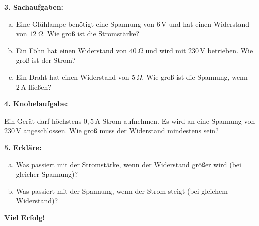 \vspace{0.5em}

\textbf{3. Sachaufgaben:}
\begin{enumerate}[a)]
    \item Eine Glühlampe benötigt eine Spannung von $6\,\mathrm{V}$ und hat einen Widerstand von $12\,\Omega$. Wie groß ist die Stromstärke?
    \item Ein Föhn hat einen Widerstand von $40\,\Omega$ und wird mit $230\,\mathrm{V}$ betrieben. Wie groß ist der Strom?
    \item Ein Draht hat einen Widerstand von $5\,\Omega$. Wie groß ist die Spannung, wenn $2\,\mathrm{A}$ fließen?
\end{enumerate}

\vspace{0.5em}

\textbf{4. Knobelaufgabe:}

Ein Gerät darf höchstens $0{,}5\,\mathrm{A}$ Strom aufnehmen. Es wird an eine Spannung von $230\,\mathrm{V}$ angeschlossen. Wie groß muss der Widerstand mindestens sein?

\vspace{0.5em}

\textbf{5. Erkläre:}

\begin{enumerate}[a)]
    \item Was passiert mit der Stromstärke, wenn der Widerstand größer wird (bei gleicher Spannung)?
    \item Was passiert mit der Spannung, wenn der Strom steigt (bei gleichem Widerstand)?
\end{enumerate}

\textbf{Viel Erfolg!}